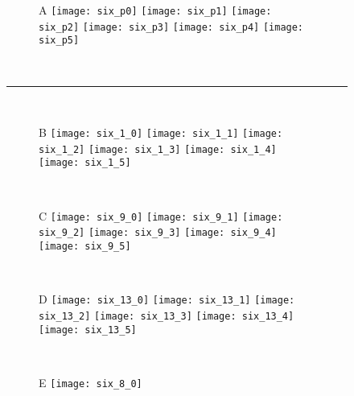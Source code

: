 \newpage

\null
\vfill

\begin{figure}[H]
  \centering
  \begin{subfigure}{\textwidth}
    \textsf{A}
    \centering
    \texttt{[image: six\_p0]}
    \texttt{[image: six\_p1]}
    \texttt{[image: six\_p2]}
    \texttt{[image: six\_p3]}
    \texttt{[image: six\_p4]}
    \texttt{[image: six\_p5]}
  \end{subfigure}\\[1em]
  \hspace{1em}\rule{0.95\textwidth}{1.8pt}\\
  \vspace{1em}
  \begin{subfigure}{\textwidth}
    \textsf{B}
    \centering
    \texttt{[image: six\_1\_0]}
    \texttt{[image: six\_1\_1]}
    \texttt{[image: six\_1\_2]}
    \texttt{[image: six\_1\_3]}
    \texttt{[image: six\_1\_4]}
    \texttt{[image: six\_1\_5]}
  \end{subfigure}\\[0.8em]
  \begin{subfigure}{\textwidth}
    \textsf{C}
    \centering
    \texttt{[image: six\_9\_0]}
    \texttt{[image: six\_9\_1]}
    \texttt{[image: six\_9\_2]}
    \texttt{[image: six\_9\_3]}
    \texttt{[image: six\_9\_4]}
    \texttt{[image: six\_9\_5]}
  \end{subfigure}\\[0.8em]
  \begin{subfigure}{\textwidth}
    \textsf{D}
    \centering
    \texttt{[image: six\_13\_0]}
    \texttt{[image: six\_13\_1]}
    \texttt{[image: six\_13\_2]}
    \texttt{[image: six\_13\_3]}
    \texttt{[image: six\_13\_4]}
    \texttt{[image: six\_13\_5]}
  \end{subfigure}\\[0.8em]
  \begin{subfigure}{\textwidth}
    \textsf{E}
    \centering
    \texttt{[image: six\_8\_0]}

\end{subfigure}
\end{figure}

